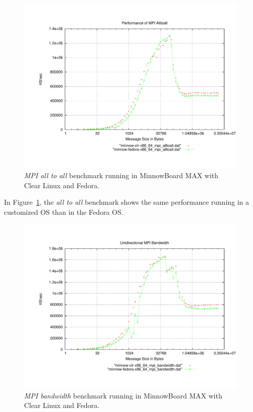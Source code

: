 \begin{figure}
  \includegraphics[width=\paperwidth]{images/mpbench_clr_experiments/mpi_alltoall.pdf}
\caption{\textit{MPI all to all} benchmark running in MinnowBoard MAX with Clear Linux and
Fedora.}
\label{mpi_alltoall_clr_fedora}
\end{figure}

In Figure~\ref{mpi_alltoall_clr_fedora}, the \textit{all to all} benchmark
shows the same performance running in a customized OS than in the Fedora OS. 

\begin{figure}
 \includegraphics[width=\paperwidth]{images/mpbench_clr_experiments/mpi_bandwidth.pdf}
\caption{\textit{MPI bandwidth} benchmark running in MinnowBoard MAX with Clear Linux and
Fedora.}
\label{mpi_bandwidth_clr_fedora}
\end{figure}


